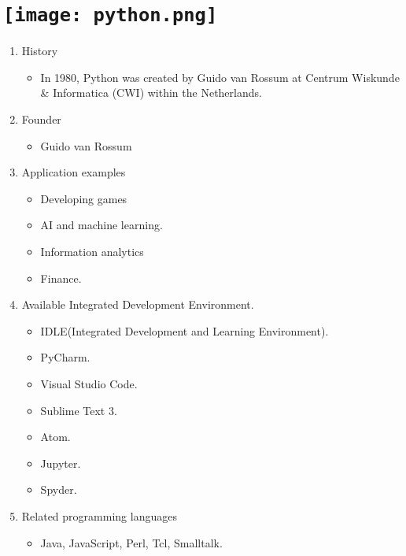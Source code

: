 \section{\texttt{[image: python.png]}}
\begin{frame}
	
	
	\begin{enumerate}
		\item History
		\begin{itemize}
			\item In 1980, Python was created by Guido van Rossum at Centrum Wiskunde & Informatica (CWI) within the Netherlands.
		\end{itemize}
		\item Founder
		\begin{itemize}
			\item Guido van Rossum
		\end{itemize}
		\item Application examples
		\begin{itemize}
			\item Developing games
			\item AI and machine learning.
			\item Information analytics
			\item Finance.
		\end{itemize}
		\item Available Integrated Development Environment.
		\begin{itemize}
			\item IDLE(Integrated Development and Learning Environment).
			\item PyCharm.
			\item Visual Studio Code.
			\item Sublime Text 3. 
			\item Atom. 
			\item Jupyter.
			\item Spyder.
		\end{itemize}
		\item Related programming languages
		\begin{itemize}
			\item Java, JavaScript, Perl, Tcl, Smalltalk.
		\end{itemize}
	\end{enumerate}
	
\end{frame}


